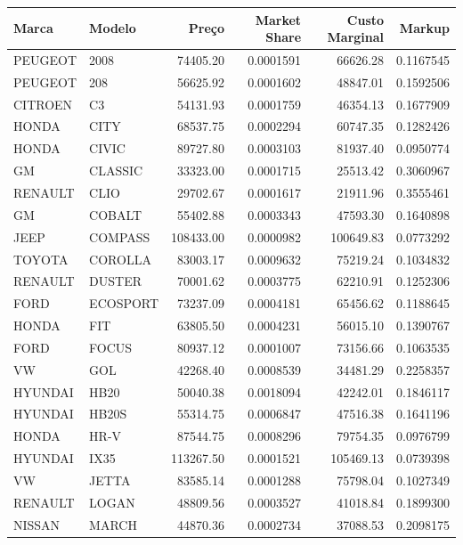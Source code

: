 \documentclass{article}
\begin{document}
\begin{table}[H]
\centering
\begin{tabular}{l|l|r|r|r|r}
Marca & Modelo & Preço & Market Share & Custo Marginal & Markup\\
\hline\hline
PEUGEOT & 2008 & 74405.20 & 0.0001591 & 66626.28 & 0.1167545\\
\hline
PEUGEOT & 208 & 56625.92 & 0.0001602 & 48847.01 & 0.1592506\\
\hline
CITROEN & C3 & 54131.93 & 0.0001759 & 46354.13 & 0.1677909\\
\hline
HONDA & CITY & 68537.75 & 0.0002294 & 60747.35 & 0.1282426\\
\hline
HONDA & CIVIC & 89727.80 & 0.0003103 & 81937.40 & 0.0950774\\
\hline
GM & CLASSIC & 33323.00 & 0.0001715 & 25513.42 & 0.3060967\\
\hline
RENAULT & CLIO & 29702.67 & 0.0001617 & 21911.96 & 0.3555461\\
\hline
GM & COBALT & 55402.88 & 0.0003343 & 47593.30 & 0.1640898\\
\hline
JEEP & COMPASS & 108433.00 & 0.0000982 & 100649.83 & 0.0773292\\
\hline
TOYOTA & COROLLA & 83003.17 & 0.0009632 & 75219.24 & 0.1034832\\
\hline
RENAULT & DUSTER & 70001.62 & 0.0003775 & 62210.91 & 0.1252306\\
\hline
FORD & ECOSPORT & 73237.09 & 0.0004181 & 65456.62 & 0.1188645\\
\hline
HONDA & FIT & 63805.50 & 0.0004231 & 56015.10 & 0.1390767\\
\hline
FORD & FOCUS & 80937.12 & 0.0001007 & 73156.66 & 0.1063535\\
\hline
VW & GOL & 42268.40 & 0.0008539 & 34481.29 & 0.2258357\\
\hline
HYUNDAI & HB20 & 50040.38 & 0.0018094 & 42242.01 & 0.1846117\\
\hline
HYUNDAI & HB20S & 55314.75 & 0.0006847 & 47516.38 & 0.1641196\\
\hline
HONDA & HR-V & 87544.75 & 0.0008296 & 79754.35 & 0.0976799\\
\hline
HYUNDAI & IX35 & 113267.50 & 0.0001521 & 105469.13 & 0.0739398\\
\hline
VW & JETTA & 83585.14 & 0.0001288 & 75798.04 & 0.1027349\\
\hline
RENAULT & LOGAN & 48809.56 & 0.0003527 & 41018.84 & 0.1899300\\
\hline
NISSAN & MARCH & 44870.36 & 0.0002734 & 37088.53 & 0.2098175\\

\end{tabular}
\end{table}
\end{document}
